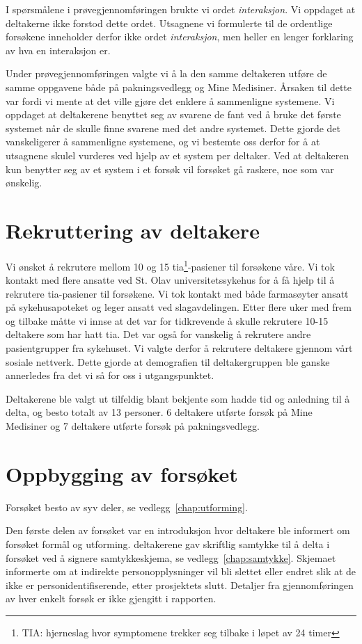 I spørsmålene i prøvegjennomføringen brukte vi ordet \textit{interaksjon}. Vi oppdaget at deltakerne ikke forstod dette ordet. Utsagnene vi formulerte til de ordentlige forsøkene inneholder derfor ikke ordet \textit{interaksjon}, men heller en lenger forklaring av hva en interaksjon er. 

Under prøvegjennomføringen valgte vi å la den samme deltakeren utføre de samme oppgavene både på pakningsvedlegg og Mine Medisiner. Årsaken til dette var fordi vi mente at det ville gjøre det enklere å sammenligne systemene. Vi oppdaget at deltakerene benyttet seg av svarene de fant ved å bruke det første systemet når de skulle finne svarene med det andre systemet. Dette gjorde det vanskeligerer å sammenligne systemene, og vi bestemte oss derfor for å at utsagnene skulel vurderes ved hjelp av et system per deltaker. Ved at deltakeren kun benytter seg av et system i et forsøk vil forsøket gå raskere, noe som var ønskelig. 

\section{Rekruttering av deltakere}
Vi ønsket å rekrutere mellom 10 og 15 \acrshort{tia}\footnote{TIA: hjerneslag hvor symptomene trekker seg tilbake i løpet av 24 timer}-pasiener til forsøkene våre. Vi tok kontakt med flere ansatte ved St. Olav universitetssykehus for å få hjelp til å rekrutere \acrshort{tia}-pasiener til forsøkene. Vi tok kontakt med både farmasøyter ansatt på sykehusapoteket og leger ansatt ved slagavdelingen. Etter flere uker med frem og tilbake måtte vi innse at det var for tidkrevende å skulle rekrutere 10-15 deltakere som har hatt \acrshort{tia}. Det var også for vanskelig å rekrutere andre pasientgrupper fra sykehuset. Vi valgte derfor å rekrutere deltakere gjennom vårt sosiale nettverk. Dette gjorde at demografien til deltakergruppen ble ganske annerledes fra det vi så for oss i utgangspunktet. 

Deltakerene ble valgt ut tilfeldig blant bekjente som hadde tid og anledning til å delta, og besto totalt av 13 personer. 6 deltakere utførte forsøk på Mine Medisiner og 7 deltakere utførte forsøk på pakningsvedlegg.
    
\section{Oppbygging av forsøket}
Forsøket besto av syv deler, se vedlegg~\ref{chap:utforming}.

Den første delen av forsøket var en introduksjon hvor deltakere ble informert om forsøket formål og utforming. deltakerene gav skriftlig samtykke til å delta i forsøket ved å signere samtykkeskjema, se vedlegg~\ref{chap:samtykke}. Skjemaet informerte om at indirekte personopplysninger vil bli slettet eller endret slik at de ikke er personidentifiserende, etter prosjektets slutt. Detaljer fra gjennomføringen av hver enkelt forsøk er ikke gjengitt i rapporten.

